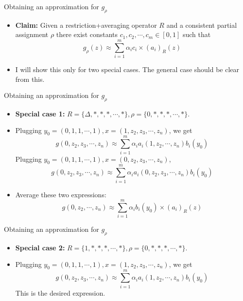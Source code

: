\begin{frame}{Obtaining an approximation for $g_{\rho}$}
	\begin{itemize}
		\item<1-> \textbf{Claim: }Given a restriction+averaging operator $R$ and a consistent partial assignment $\rho$ there exist constants $c_1, c_2, \cdots , c_m \in [0,1]$ such that
		$$ g_{\rho} (z) \approx \displaystyle \sum_{i=1}^{m} \alpha_i c_i \times (a_i)_{R} (z)$$
		\item<2-> I will show this only for two special cases. The general case should be clear from this.

	\end{itemize}	
	
\end{frame}


\begin{frame}{Obtaining an approximation for $g_{\rho}$}
	\begin{itemize}
		\item<1->\textbf{Special case 1: } $R= \{\Delta , *, *, *, \cdots , *\}, \rho = \{0, *, *, *, \cdots , *\}$.
		\item<2-> Plugging $y_0= (0, 1, 1, \cdots , 1), x= (1, z_2, z_3, \cdots , z_n)$, we get
		$$ g(0, z_2, z_3, \cdots , z_n) \approx \displaystyle \sum_{i=1}^{m} \alpha_i a_i(1, z_2, \cdots , z_n) b_i(y_0)$$
		Plugging $y_0= (0, 1, 1, \cdots , 1), x= (0, z_2, z_3, \cdots , z_n)$,
		$$ g(0, z_2, z_3, \cdots , z_n) \approx \displaystyle \sum_{i=1}^{m} \alpha_i a_i(0, z_2, z_3, \cdots , z_n) b_i(y_0) $$
		\item<3-> Average these two expressions:
		$$ g(0, z_2, \cdots , z_n) \approx \displaystyle \sum_{i=1}^{m} \alpha_i b_i(y_0) \times (a_i)_R(z)$$
			
	\end{itemize}	
	
\end{frame}

\begin{frame}{Obtaining an approximation for $g_{\rho}$}
	\begin{itemize}
		\item<1->\textbf{Special case 2: } $R= \{1 , *, *, *, \cdots , *\}, \rho = \{0, *, *, *, \cdots , *\}$.
		\item<2-> Plugging $y_0= (0, 1, 1, \cdots , 1), x= (1, z_2, z_3, \cdots , z_n)$, we get
		$$ g(0, z_2, z_3, \cdots , z_n) \approx \displaystyle \sum_{i=1}^{m} \alpha_i a_i(1, z_2, \cdots , z_n) b_i(y_0)$$
		This is the desired expression.
		
	\end{itemize}	
	
\end{frame}



